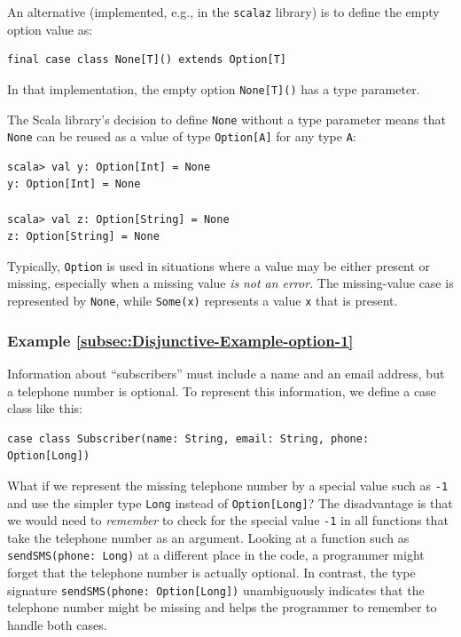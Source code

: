 An alternative (implemented, e.g., in the \texttt{scalaz} library)
is to define the empty option value as:
\begin{lstlisting}
final case class None[T]() extends Option[T]
\end{lstlisting}
In that implementation, the empty option \lstinline!None[T]()! has
a type parameter.

The Scala library\textsf{'}s decision to define \lstinline!None! without a
type parameter means that \lstinline!None! can be reused as a value
of type \lstinline!Option[A]! for any type \lstinline!A!:
\begin{lstlisting}
scala> val y: Option[Int] = None
y: Option[Int] = None

scala> val z: Option[String] = None
z: Option[String] = None
\end{lstlisting}

Typically, \lstinline!Option! is used in situations where a value
may be either present or missing, especially when a missing value
\emph{is} \emph{not an error}. The missing-value case is represented
by \lstinline!None!, while \lstinline!Some(x)! represents a value
\lstinline!x! that is present.

\subsubsection{Example \label{subsec:Disjunctive-Example-option-1}\ref{subsec:Disjunctive-Example-option-1}}

Information about \textsf{``}subscribers\textsf{''} must include a name and an email
address, but a telephone number is optional. To represent this information,
we define a case class like this:
\begin{lstlisting}
case class Subscriber(name: String, email: String, phone: Option[Long])
\end{lstlisting}
What if we represent the missing telephone number by a special value
such as \lstinline!-1! and use the simpler type \lstinline!Long!
instead of \lstinline!Option[Long]!? The disadvantage is that we
would need to \emph{remember} to check for the special value \lstinline!-1!
in all functions that take the telephone number as an argument. Looking
at a function such as \lstinline!sendSMS(phone: Long)! at a different
place in the code, a programmer might forget that the telephone number
is actually optional. In contrast, the type signature \lstinline!sendSMS(phone: Option[Long])!
unambiguously indicates that the telephone number might be missing
and helps the programmer to remember to handle both cases.

